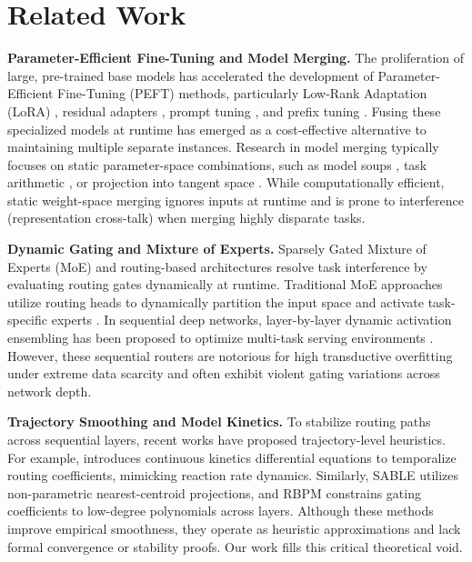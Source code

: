 \section{Related Work}
\label{sec:related_work}

\textbf{Parameter-Efficient Fine-Tuning and Model Merging.} 
The proliferation of large, pre-trained base models has accelerated the development of Parameter-Efficient Fine-Tuning (PEFT) methods, particularly Low-Rank Adaptation (LoRA) \cite{hu2021lora}, residual adapters \cite{houlsby2019parameter, rebuffi2017learning}, prompt tuning \cite{lester2021power}, and prefix tuning \cite{li2021prefix}. Fusing these specialized models at runtime has emerged as a cost-effective alternative to maintaining multiple separate instances. Research in model merging typically focuses on static parameter-space combinations, such as model soups \cite{wortsman2022soups}, task arithmetic \cite{ilharco2022editing}, or projection into tangent space \cite{ortiz2023task}. While computationally efficient, static weight-space merging ignores inputs at runtime and is prone to interference (representation cross-talk) when merging highly disparate tasks. 

\textbf{Dynamic Gating and Mixture of Experts.} 
Sparsely Gated Mixture of Experts (MoE) \cite{shazeer2017outrageously} and routing-based architectures \cite{fedus2022switch} resolve task interference by evaluating routing gates dynamically at runtime. Traditional MoE approaches utilize routing heads to dynamically partition the input space and activate task-specific experts \cite{jacobs1991adaptive, jordan1994hierarchical}. In sequential deep networks, layer-by-layer dynamic activation ensembling has been proposed to optimize multi-task serving environments \cite{sable2025samplewise}. However, these sequential routers are notorious for high transductive overfitting under extreme data scarcity and often exhibit violent gating variations across network depth. 

\textbf{Trajectory Smoothing and Model Kinetics.} 
To stabilize routing paths across sequential layers, recent works have proposed trajectory-level heuristics. For example, \cite{chemmerge2025kinetics} introduces continuous kinetics differential equations to temporalize routing coefficients, mimicking reaction rate dynamics. Similarly, SABLE \cite{sable2025samplewise} utilizes non-parametric nearest-centroid projections, and RBPM \cite{rbpm2026rademacher} constrains gating coefficients to low-degree polynomials across layers. Although these methods improve empirical smoothness, they operate as heuristic approximations and lack formal convergence or stability proofs. Our work fills this critical theoretical void.

